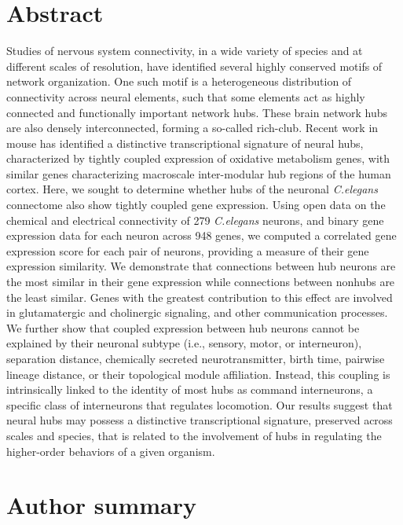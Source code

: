 \section*{Abstract}
Studies of nervous system connectivity, in a wide variety of species and at different scales of resolution, have identified several highly conserved motifs of network organization.
One such motif is a heterogeneous distribution of connectivity across neural elements, such that some elements act as highly connected and functionally important network hubs.
These brain network hubs are also densely interconnected, forming a so-called rich-club.
Recent work in mouse has identified a distinctive transcriptional signature of neural hubs, characterized by tightly coupled expression of oxidative metabolism genes, with similar genes characterizing macroscale inter-modular hub regions of the human cortex.
Here, we sought to determine whether hubs of the neuronal \textit{C.elegans} connectome also show tightly coupled gene expression. Using open data on the chemical and electrical connectivity of 279 \textit{C.elegans} neurons, and binary gene expression data for each neuron across 948 genes, we computed a correlated gene expression score for each pair of neurons, providing a measure of their gene expression similarity.
We demonstrate that connections between hub neurons are the most similar in their gene expression while connections between nonhubs are the least similar.
Genes with the greatest contribution to this effect are involved in glutamatergic and cholinergic signaling, and other communication processes.
We further show that coupled expression between hub neurons cannot be explained by their neuronal subtype (i.e., sensory, motor, or interneuron), separation distance, chemically secreted neurotransmitter, birth time, pairwise lineage distance, or their topological module affiliation.
Instead, this coupling is intrinsically linked to the identity of most hubs as command interneurons, a specific class of interneurons that regulates locomotion.
Our results suggest that neural hubs may possess a distinctive transcriptional signature, preserved across scales and species, that is related to the involvement of hubs in regulating the higher-order behaviors of a given organism.

\section*{Author summary}

